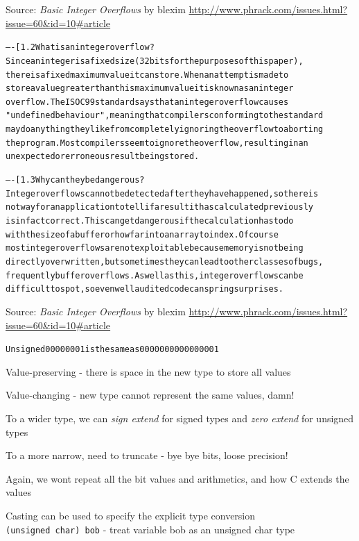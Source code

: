 \documentclass[Screen16to9,17pt]{foils}
\begin{document}
Source:
\emph{Basic Integer Overflows} by blexim
\url{http://www.phrack.com/issues.html?issue=60&id=10#article}


\begin{alltt}\footnotesize
----[ 1.2 What is an integer overflow?
Since an integer is a fixed size (32 bits for the purposes of this paper),
there is a fixed maximum value it can store.  When an attempt is made to
store a value greater than this maximum value it is known as an integer
overflow.  The ISO C99 standard says that an integer overflow causes
"undefined behaviour", meaning that compilers conforming to the standard
may do anything they like from completely ignoring the overflow to aborting
the program.  Most compilers seem to ignore the overflow, resulting in an
unexpected or erroneous result being stored.

----[ 1.3 Why can they be dangerous?
Integer overflows cannot be detected after they have happened, so there is
not way for an application to tell if a result it has calculated previously
is in fact correct.  This can get dangerous if the calculation has to do
with the size of a buffer or how far into an array to index.  Of course
most integer overflows are not exploitable because memory is not being
directly overwritten, but sometimes they can lead to other classes of bugs,
frequently buffer overflows.  As well as this, integer overflows can be
difficult to spot, so even well audited code can spring surprises.
\end{alltt}

Source:
\emph{Basic Integer Overflows} by blexim
\url{http://www.phrack.com/issues.html?issue=60&id=10#article}



\begin{alltt}
Unsigned 00000001 is the same as 0000000000000001
\end{alltt}

\begin{list2}
\item Value-preserving - there is space in the new type to store all values
\item Value-changing - new type cannot represent the same values, damn!
\item To a wider type, we can \emph{sign extend} for signed types and \emph{zero extend} for unsigned types
\item To a more narrow, need to truncate - bye bye bits, loose precision!
\item Again, we wont repeat all the bit values and arithmetics, and how C extends the values
\item Casting can be used to specify the explicit type conversion\\ \verb+(unsigned char) bob+ - treat variable bob as an unsigned char type
\end{list2}
\end{document}
